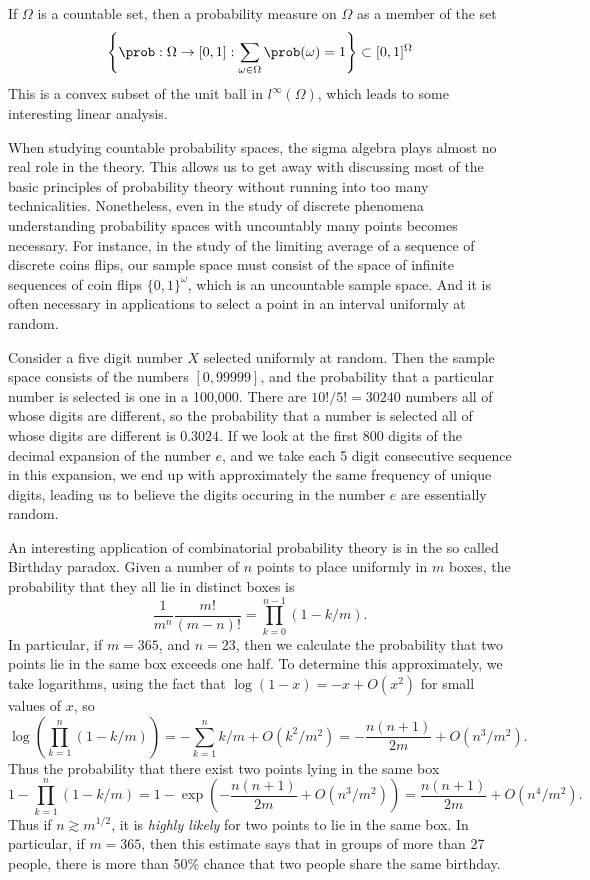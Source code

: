 \begin{example}
    If $\Omega$ is a countable set, then a probability measure on $\Omega$ as a member of the set
    \[ \left\{ \prob: \Omega \to [0,1]: \sum_{\omega \in \Omega} \prob(\omega) = 1 \right\} \subset [0,1]^\Omega \]
    This is a convex subset of the unit ball in $l^\infty(\Omega)$, which leads to some interesting linear analysis.
\end{example}

When studying countable probability spaces, the sigma algebra plays almost no real role in the theory. This allows us to get away with discussing most of the basic principles of probability theory without running into too many technicalities. Nonetheless, even in the study of discrete phenomena understanding probability spaces with uncountably many points becomes necessary. For instance, in the study of the limiting average of a sequence of discrete coins flips, our sample space must consist of the space of infinite sequences of coin flips $\{ 0, 1 \}^\omega$, which is an uncountable sample space. And it is often necessary in applications to select a point in an interval uniformly at random.

\begin{example}
    Consider a five digit number $X$ selected uniformly at random. Then the sample space consists of the numbers $[0,99999]$, and the probability that a particular number is selected is one in a 100,000. There are $10!/5! = 30240$ numbers all of whose digits are different, so the probability that a number is selected all of whose digits are different is $0.3024$. If we look at the first 800 digits of the decimal expansion of the number $e$, and we take each 5 digit consecutive sequence in this expansion, we end up with approximately the same frequency of unique digits, leading us to believe the digits occuring in the number $e$ are essentially random.
\end{example}

\begin{example}
    An interesting application of combinatorial probability theory is in the so called Birthday paradox. Given a number of $n$ points to place uniformly in $m$ boxes, the probability that they all lie in distinct boxes is
    \[ \frac{1}{m^n} \frac{m!}{(m-n)!} = \prod_{k = 0}^{n-1} (1 - k/m). \]
    In particular, if $m = 365$, and $n = 23$, then we calculate the probability that two points lie in the same box exceeds one half. To determine this approximately, we take logarithms, using the fact that $\log(1 - x) = -x + O(x^2)$ for small values of $x$, so
    \[ \log \left( \prod_{k = 1}^n (1 - k/m) \right) = - \sum_{k = 1}^n k/m + O(k^2/m^2) = - \frac{n(n+1)}{2m} + O(n^3/m^2). \]
    Thus the probability that there exist two points lying in the same box
    \[ 1 - \prod_{k = 1}^n (1 - k/m) = 1 - \exp \left( - \frac{n(n+1)}{2m} + O(n^3/m^2) \right) = \frac{n(n+1)}{2m} + O(n^4/m^2). \]
    Thus if $n \gtrsim m^{1/2}$, it is {\it highly likely} for two points to lie in the same box. In particular, if $m = 365$, then this estimate says that in groups of more than 27 people, there is more than 50\% chance that two people share the same birthday.
\end{example}

